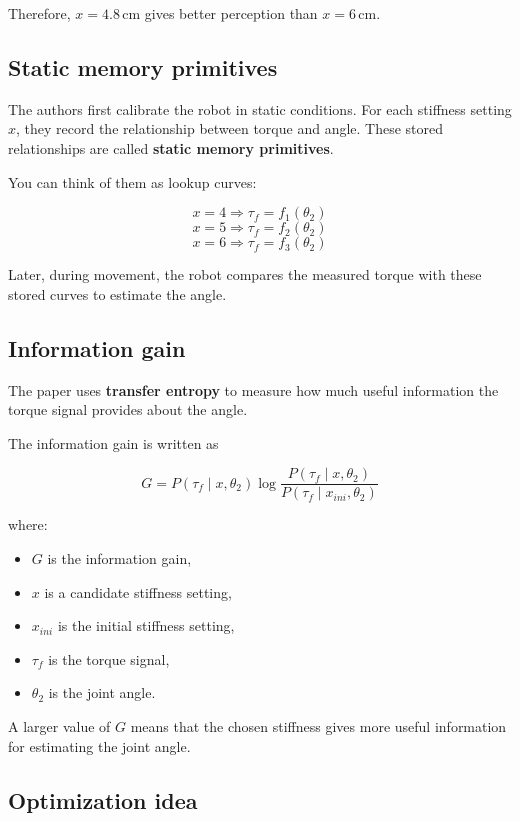Therefore, \( x = 4.8 \,\text{cm} \) gives better perception than \( x = 6 \,\text{cm} \).

\subsection*{Static memory primitives}

The authors first calibrate the robot in static conditions. For each stiffness setting \( x \), they record the relationship between torque and angle. These stored relationships are called \textbf{static memory primitives}.

You can think of them as lookup curves:

\[
x=4 \Rightarrow \tau_f = f_1(\theta_2)
\]
\[
x=5 \Rightarrow \tau_f = f_2(\theta_2)
\]
\[
x=6 \Rightarrow \tau_f = f_3(\theta_2)
\]

Later, during movement, the robot compares the measured torque with these stored curves to estimate the angle.

\subsection*{Information gain}

The paper uses \textbf{transfer entropy} to measure how much useful information the torque signal provides about the angle.

The information gain is written as

\[
G = P(\tau_f \mid x, \theta_2)\log
\frac{P(\tau_f \mid x, \theta_2)}
{P(\tau_f \mid x_{ini}, \theta_2)}
\]

where:
\begin{itemize}
    \item \( G \) is the information gain,
    \item \( x \) is a candidate stiffness setting,
    \item \( x_{ini} \) is the initial stiffness setting,
    \item \( \tau_f \) is the torque signal,
    \item \( \theta_2 \) is the joint angle.
\end{itemize}

A larger value of \( G \) means that the chosen stiffness gives more useful information for estimating the joint angle.

\subsection*{Optimization idea}

